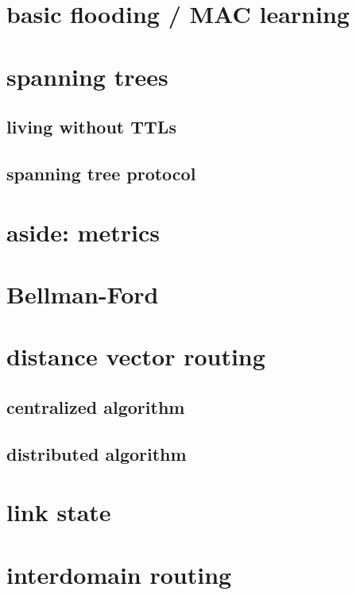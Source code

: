 \section{basic flooding / MAC learning}


\section{spanning trees}


\subsection{living without TTLs}

\subsection{spanning tree protocol}

\section{aside: metrics}

\section{Bellman-Ford}

\section{distance vector routing}

\subsection{centralized algorithm}

\subsection{distributed algorithm}

\section{link state}

\section{interdomain routing}

